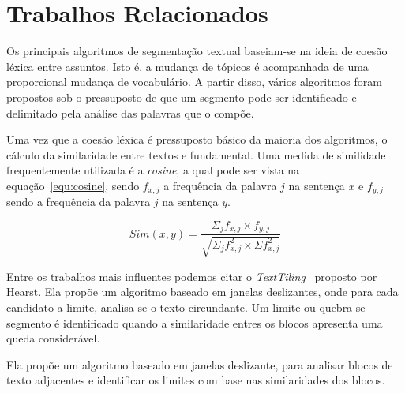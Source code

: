 \section{Trabalhos Relacionados}
	\label{sec:trabalhos}



Os principais algoritmos de segmentação textual baseiam-se na ideia de coesão léxica entre assuntos. Isto é, a mudança de tópicos é acompanhada de uma proporcional mudança de vocabulário. A partir disso, vários algoritmos foram propostos sob o pressuposto de que um segmento pode ser identificado e delimitado pela análise das palavras que o compõe.

Uma vez que a coesão léxica é pressuposto básico da maioria dos algoritmos, o cálculo da similaridade entre textos e fundamental. Uma medida de similidade frequentemente utilizada é a \textit{cosine}, a qual pode ser vista na equação~\ref{equ:cosine}, sendo $f_{x,j}$ a frequência da palavra $j$ na sentença $x$ e $f_{y,j}$ sendo a frequência da palavra $j$ na sentença $y$.


\begin{equation}
Sim(x,y) = \frac
{\Sigma_j f_{x,j} \times f_{y,j}}
{\sqrt{\Sigma_j f^2_{x,j} \times \Sigma f^2_{x,j}}}
\label{equ:cosine}
\end{equation}










Entre os trabalhos mais influentes podemos citar o \textit{TextTiling}~\cite{Hearst1994} proposto por Hearst. Ela propõe um algoritmo baseado em janelas deslizantes, onde para cada candidato a limite, analisa-se o texto circundante. Um limite ou quebra se segmento é identificado quando a similaridade entres os blocos apresenta uma queda considerável.


Ela propõe um algoritmo baseado em janelas deslizante, para analisar blocos de texto adjacentes e identificar os limites com base nas similaridades dos blocos.

